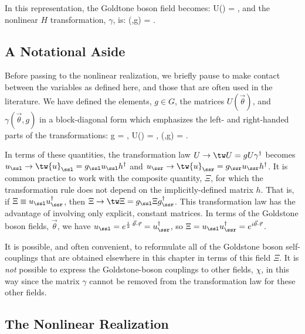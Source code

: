 \documentclass[12pt,epsf]{report}
\begin{document}
In this representation, the Goldtone boson field becomes: 
%
\eq
\label{gbfielddefex}
U(\vec\theta) = , \eeq
%
and the nonlinear $H$ transformation, $\gamma$, is: 
%
\eq
\label{gammafielddefex}
\gamma(\vec\theta,g) = . \eeq

\subsection{A Notational Aside}

Before passing to the nonlinear realization, we briefly
pause to make contact between the variables as defined
here, and those that are often used in the literature. We
have defined the elements, $g \in G$, the matrices
$U(\vec\theta)$, and 
$\gamma(\vec\theta,g)$ in a block-diagonal form which
emphasizes the left- and right-handed parts of the
transformations:
%
\eq
\label{newway}
g = , 
\quad U(\vec\theta) = , \quad \gamma(\vec\theta,g) = .
\eeq

In terms of these quantities, the transformation law $U \to
\tw 
U = g U \gamma^\dagger$ becomes $u_\ssl \to \tw{u}_\ssl = 
g_\ssl u_\ssl h^\dagger$ and $u_\ssr \to \tw{u}_\ssr =
g_\ssr 
u_\ssr h^\dagger$. It is common practice to work with the
composite quantity, $\Xi$, for which the transformation
rule does not depend on the implicitly-defined matrix $h$.
That is, if 
$\Xi \equiv u_\ssl u_\ssr^\dagger$, then $\Xi \to \tw\Xi = 
g_\ssl \Xi g_\ssr^\dagger$. This transformation law has the
advantage of involving only explicit, constant matrices. In
terms of the Goldstone boson fields, $\vec\theta$, we have
$u_\ssl = 
e^{{i \over 2}\; \vec\theta \cdot \vec\tau} =
u_\ssr^\dagger$, 
so $\Xi = u_\ssl u_\ssr^\dagger = e^{i \vec\theta \cdot
\vec\tau}$.

It is possible, and often convenient, to reformulate all of
the Goldstone boson self-couplings that are obtained
elsewhere in this chapter in terms of this field $\Xi$. It
is {\em not} possible to express the Goldstone-boson
couplings to other fields, $\chi$, in this way since the
matrix $\gamma$ cannot be removed from the transformation
law for these other fields.

\subsection{The Nonlinear Realization}
\end{document}
